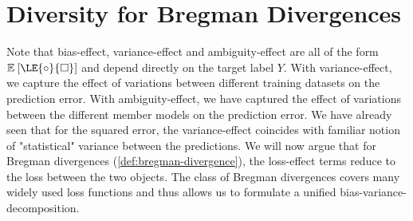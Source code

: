 \documentclass[../main.tex]{subfiles}
\begin{document}
\section{Diversity for Bregman Divergences} \label{sec:bregman-divergences}




Note that bias-effect, variance-effect and ambiguity-effect are all of the form $\mathbb{E}_{}\left[ \LE{\circ}{\square} \right]$ and depend directly on the target label $Y$. 
With variance-effect, we capture the {effect} of variations between different training datasets on the prediction error.
With ambiguity-effect, we have captured the effect of variations between the different member models on the prediction error.
We have already seen that for the squared error, the variance-effect coincides with familiar notion of "statistical" variance between the predictions.
We will now argue that for Bregman divergences (\cf \ref{def:bregman-divergence}), the loss-effect terms reduce to the loss between the two objects.
The class of Bregman divergences covers many widely used loss functions and thus allows us to formulate a unified bias-variance-decomposition. 
\end{document}
